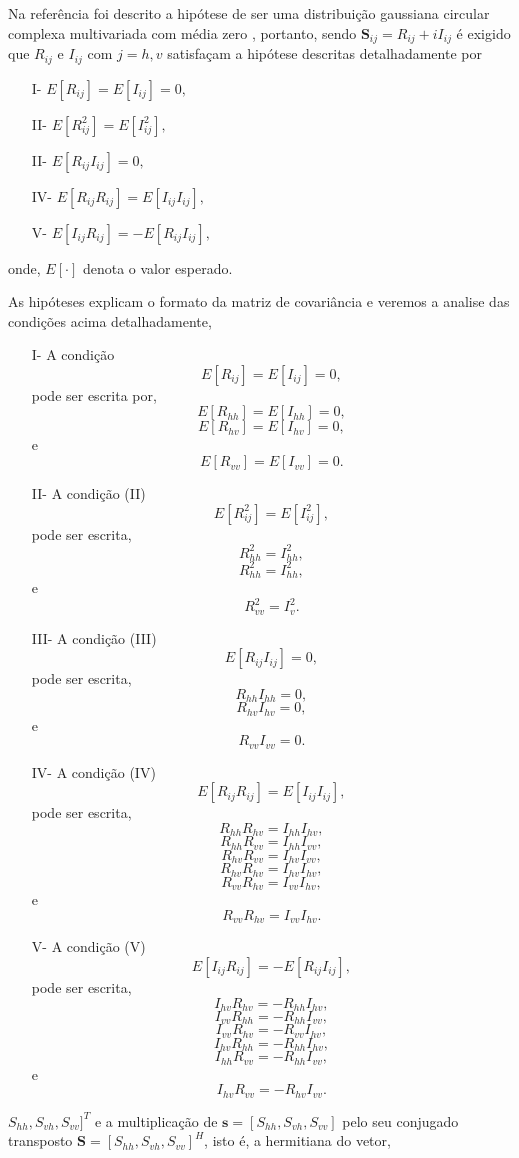 Na referência \cite{good} foi descrito a hipótese de ser uma distribuição gaussiana circular complexa multivariada com média zero , portanto, sendo $\mathbf{S}_{ij}= R_{ij}+ i I_{ij}$ é exigido que $R_{ij}$ e $I_{ij}$ com $j=h,v$ satisfaçam a hipótese descritas detalhadamente por 
\begin{itemize}
	\item[I-] $E[R_{ij}]=E[I_{ij}]=0,$
	\item[II-] $E[R_{ij}^2]=E[I_{ij}^2],$ 
	\item[II-] $E[R_{ij}I_{ij}]=0,$  
	\item[IV-] $E[R_{ij}R_{ij}]=E[I_{ij}I_{ij}],$ 
	\item[V-] $E[I_{ij}R_{ij}]=-E[R_{ij}I_{ij}],$
\end{itemize}
onde, $E[\cdot]$ denota o valor esperado. 

As hipóteses explicam o formato da matriz de covariância e veremos a analise das condições acima detalhadamente,
\begin{itemize}
	\item[I-] A condição $$E[R_{ij}]=E[I_{ij}]=0,$$ pode ser escrita por, 
	$$E[R_{hh}]=E[I_{hh}]=0,$$ 
	$$E[R_{hv}]=E[I_{hv}]=0,$$ 
  e $$E[R_{vv}]=E[I_{vv}]=0.$$	                               
	\item[II-] A condição (II) $$E[R_{ij}^2]=E[I_{ij}^2],$$ pode ser escrita,      $$R_{hh}^2=I_{hh}^2,$$ 
	$$R_{hh}^2=I_{hh}^2,$$ 
	e $$R_{vv}^2=I_{v}^2.$$
	\item[III-]A condição (III) $$E[R_{ij}I_{ij}]=0,$$ pode ser escrita, $$R_{hh}I_{hh}=0,
$$ $$R_{hv}I_{hv}=0,$$
e $$R_{vv}I_{vv}=0.$$ 
	\item[IV-] A condição (IV) $$E[R_{ij}R_{ij}]=E[I_{ij}I_{ij}],$$ pode ser escrita, $$R_{hh}R_{hv}=I_{hh}I_{hv},$$
	     $$R_{hh}R_{vv}=I_{hh}I_{vv},$$
	     $$R_{hv}R_{vv}=I_{hv}I_{vv},$$
	     $$R_{hv}R_{hv}=I_{hv}I_{hv},$$ 
	     $$R_{vv}R_{hv}=I_{vv}I_{hv},$$
	  e  $$R_{vv}R_{hv}=I_{vv}I_{hv}.$$ 
	\item[V-] A condição (V) 
	$$E[I_{ij}R_{ij}]=-E[R_{ij}I_{ij}],$$ pode ser escrita,
    $$I_{hv}R_{hv}=-R_{hh}I_{hv},$$
    $$I_{vv}R_{hh}=-R_{hh}I_{vv},$$
    $$I_{vv}R_{hv}=-R_{vv}I_{hv},$$
    $$I_{hv}R_{hh}=-R_{hh}I_{hv},$$
    $$I_{hh}R_{vv}=-R_{hh}I_{vv},$$
  e $$I_{hv}R_{vv}=-R_{hv}I_{vv}.$$ 
\end{itemize}
$S_{hh},S_{vh},S_{vv}]^T$ e a multiplicação de $\mathbf{s}=[S_{hh},S_{vh},S_{vv}]$ pelo seu conjugado transposto $\mathbf{S}=[S_{hh},S_{vh},S_{vv}]^H$, isto é, a hermitiana do vetor, 

